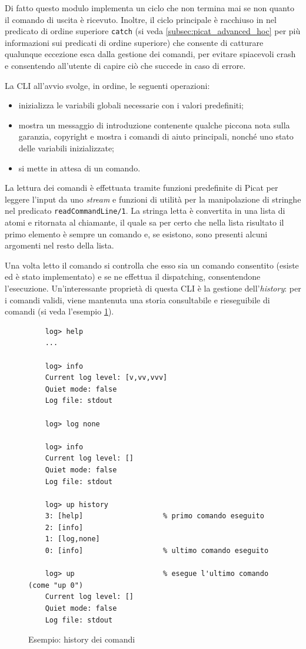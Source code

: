 \documentclass[12pt,a4paper,openright]{book} %
\begin{document}
Di fatto questo modulo implementa un ciclo che non termina mai se non
quanto il comando di uscita è ricevuto. Inoltre, il ciclo principale è
racchiuso in nel predicato di ordine superiore \texttt{catch} (si veda
\ref{subsec:picat_advanced_hoc} per più informazioni sui predicati di
ordine superiore) che consente di catturare qualunque eccezione esca
dalla gestione dei comandi, per evitare spiacevoli crash e consentendo
all'utente di capire ciò che succede in caso di errore.

La CLI all'avvio svolge, in ordine, le seguenti operazioni:
\begin{itemize}
	\item inizializza le variabili globali necessarie con i valori
          predefiniti;
	\item mostra un messaggio di introduzione contenente qualche
          piccona nota sulla garanzia, copyright e mostra i comandi di
          aiuto principali, nonché uno stato delle variabili
          inizializzate;
	\item si mette in attesa di un comando.
\end{itemize}

La lettura dei comandi è effettuata tramite funzioni predefinite di
Picat per leggere l'input da uno \emph{stream} e funzioni di utilità
per la manipolazione di stringhe nel predicato
\texttt{readCommandLine/1}. La stringa letta è convertita in una lista
di atomi e ritornata al chiamante, il quale sa per certo che nella
lista risultato il primo elemento è sempre un comando e, se esistono,
sono presenti alcuni argomenti nel resto della lista.

Una volta letto il comando si controlla che esso sia un comando
consentito (esiste ed è stato implementato) e se ne effettua il
dispatching, consentendone l'esecuzione. Un'interessante proprietà di
questa CLI è la gestione dell'\textit{history}: per i comandi validi,
viene mantenuta una storia consultabile e rieseguibile di comandi (si
veda l'esempio \ref{fig:example_commandshistory}).

\begin{figure}
	\begin{verbatim}
	log> help
	...

	log> info
	Current log level: [v,vv,vvv]
	Quiet mode: false
	Log file: stdout

	log> log none

	log> info
	Current log level: []
	Quiet mode: false
	Log file: stdout

	log> up history
	3: [help]                   % primo comando eseguito
	2: [info]
	1: [log,none]
	0: [info]                   % ultimo comando eseguito

	log> up                     % esegue l'ultimo comando (come "up 0")
	Current log level: []
	Quiet mode: false
	Log file: stdout
	\end{verbatim}
	\caption{Esempio: history dei comandi}
	\label{fig:example_commandshistory}
\end{figure}
\end{document}
